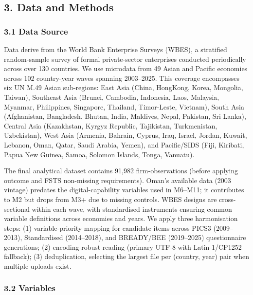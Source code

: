 \documentclass[
  12pt,a4paper]{article}
\begin{document}
\hypertarget{data-and-methods}{%
\subsection{3. Data and Methods}\label{data-and-methods}}

\hypertarget{data-source}{%
\subsubsection{3.1 Data Source}\label{data-source}}

Data derive from the World Bank Enterprise Surveys (WBES), a stratified
random-sample survey of formal private-sector enterprises conducted
periodically across over 130 countries. We use microdata from 49 Asian
and Pacific economies across 102 country-year waves spanning 2003--2025.
This coverage encompasses six UN M.49 Asian sub-regions: East Asia
(China, HongKong, Korea, Mongolia, Taiwan), Southeast Asia (Brunei,
Cambodia, Indonesia, Laos, Malaysia, Myanmar, Philippines, Singapore,
Thailand, Timor-Leste, Vietnam), South Asia (Afghanistan, Bangladesh,
Bhutan, India, Maldives, Nepal, Pakistan, Sri Lanka), Central Asia
(Kazakhstan, Kyrgyz Republic, Tajikistan, Turkmenistan, Uzbekistan),
West Asia (Armenia, Bahrain, Cyprus, Iraq, Israel, Jordan, Kuwait,
Lebanon, Oman, Qatar, Saudi Arabia, Yemen), and Pacific/SIDS (Fiji,
Kiribati, Papua New Guinea, Samoa, Solomon Islands, Tonga, Vanuatu).

The final analytical dataset contains 91,982 firm-observations (before
applying outcome and FSTS non-missing requirements). Oman's available
data (2003 vintage) predates the digital-capability variables used in
M6--M11; it contributes to M2 but drops from M3+ due to missing
controls. WBES designs are cross-sectional within each wave, with
standardised instruments ensuring common variable definitions across
economies and years. We apply three harmonisation steps: (1)
variable-priority mapping for candidate items across PICS3 (2009--2013),
Standardised (2014--2018), and BREADY/BEE (2019--2025) questionnaire
generations; (2) encoding-robust reading (primary UTF-8 with
Latin-1/CP1252 fallback); (3) deduplication, selecting the largest file
per (country, year) pair when multiple uploads exist.

\hypertarget{variables}{%
\subsubsection{3.2 Variables}\label{variables}}
\end{document}
